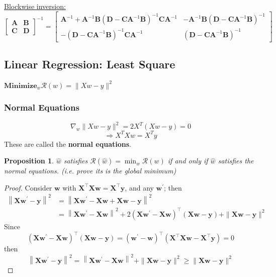 \documentclass[11pt,a4paper]{article}
\newtheorem{proposition}{Proposition}
\begin{document}
\underline{Blockwise inversion: }$$
{\displaystyle {\begin{bmatrix}\mathbf {A} &\mathbf {B} \\\mathbf {C} &\mathbf {D} \end{bmatrix}}^{-1}={\begin{bmatrix}\mathbf {A} ^{-1}+\mathbf {A} ^{-1}\mathbf {B} \left(\mathbf {D} -\mathbf {CA} ^{-1}\mathbf {B} \right)^{-1}\mathbf {CA} ^{-1}&-\mathbf {A} ^{-1}\mathbf {B} \left(\mathbf {D} -\mathbf {CA} ^{-1}\mathbf {B} \right)^{-1}\\-\left(\mathbf {D} -\mathbf {CA} ^{-1}\mathbf {B} \right)^{-1}\mathbf {CA} ^{-1}&\left(\mathbf {D} -\mathbf {CA} ^{-1}\mathbf {B} \right)^{-1}\end{bmatrix}}}
$$







\subsection{Linear Regression: Least Square}
$\textbf{Minimize}_w \mathcal{R}(w)=\|Xw-y\|^2$
\subsubsection{Normal Equations}
$$\nabla_w\|Xw-y\|^2=2X^T(Xw-y)=0$$
$$\Rightarrow X^TXw=X^Ty$$
These are called the \textbf{normal equations}.
\begin{proposition}
    $\hat{w}$ satisfies $\mathcal{R}(\hat{w})=\min_w\mathcal{R}(w)$ if and only if $\hat{w}$ satisfies the normal equations. (i.e. prove its is the global minimum)
\end{proposition}
\begin{proof}
Consider $\boldsymbol{w}$ with $\boldsymbol{X}^{\top} \boldsymbol{X} \boldsymbol{w}=\boldsymbol{X}^{\top} \boldsymbol{y}$, and any $\boldsymbol{w}^{\prime}$; then $$\begin{aligned}\left\|\boldsymbol{X} \boldsymbol{w}^{\prime}-\boldsymbol{y}\right\|^{2} &=\left\|\boldsymbol{X} \boldsymbol{w}^{\prime}-\boldsymbol{X} \boldsymbol{w}+\boldsymbol{X} \boldsymbol{w}-\boldsymbol{y}\right\|^{2} \\ &=\left\|\boldsymbol{X} \boldsymbol{w}^{\prime}-\boldsymbol{X} \boldsymbol{w}\right\|^{2}+2\left(\boldsymbol{X} \boldsymbol{w}^{\prime}-\boldsymbol{X} \boldsymbol{w}\right)^{\top}(\boldsymbol{X} \boldsymbol{w}-\boldsymbol{y})+\|\boldsymbol{X} \boldsymbol{w}-\boldsymbol{y}\|^{2} \end{aligned}$$
Since
$$
\left(\boldsymbol{X} \boldsymbol{w}^{\prime}-\boldsymbol{X} \boldsymbol{w}\right)^{\top}(\boldsymbol{X} \boldsymbol{w}-\boldsymbol{y})=\left(\boldsymbol{w}^{\prime}-\boldsymbol{w}\right)^{\top}\left(\boldsymbol{X}^{\top} \boldsymbol{X} \boldsymbol{w}-\boldsymbol{X}^{\top} \boldsymbol{y}\right)=0
$$
then
$$
\left\|\boldsymbol{X} \boldsymbol{w}^{\prime}-\boldsymbol{y}\right\|^{2}=\left\|\boldsymbol{X} \boldsymbol{w}^{\prime}-\boldsymbol{X} \boldsymbol{w}\right\|^{2}+\|\boldsymbol{X} \boldsymbol{w}-\boldsymbol{y}\|^{2} \geq\|\boldsymbol{X} \boldsymbol{w}-\boldsymbol{y}\|^{2}
$$
\end{proof}
\end{document}
